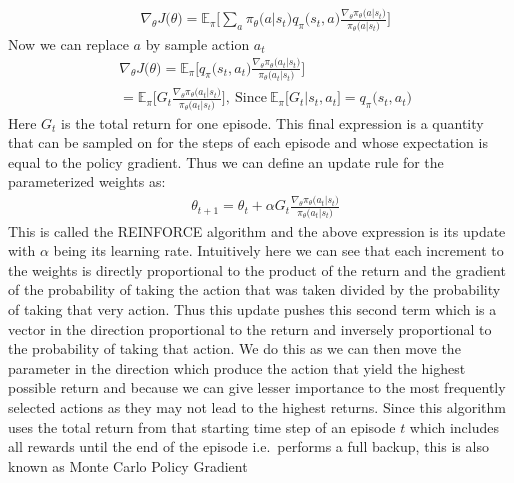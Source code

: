 \documentclass[14pt]{extarticle}
\numberwithin{equation}{section}
\begin{document}
	\begin{align}
	&\nabla_{\theta}J\big(\theta\big) = \mathbb{E}_{\pi}\bigg[\sum_{a}\pi_{\theta}\big(a|s_t\big)q_{\pi}\big(s_t,a\big)\frac{\nabla_{\theta}\pi_{\theta}\big(a|s_t\big)}{\pi_{\theta}\big(a|s_t\big)} \bigg]
	\end{align}
	Now we can replace $a$ by sample action $a_t$
	\begin{align}
	&\nabla_{\theta}J\big(\theta\big) = \mathbb{E}_{\pi}\bigg[q_{\pi}\big(s_t,a_t\big)\frac{\nabla_{\theta}\pi_{\theta}\big(a_t|s_t\big)}{\pi_{\theta}\big(a_t|s_t\big)} \bigg] \nonumber \\
	&=\mathbb{E}_{\pi}\bigg[G_t\frac{\nabla_{\theta}\pi_{\theta}\big(a_t|s_t\big)}{\pi_{\theta}\big(a_t|s_t\big)} \bigg],\ \text{Since} \  \mathbb{E}_{\pi}\big[G_t|s_t,a_t\big] = q_{\pi}\big(s_t,a_t\big)
	\end{align}
	Here $G_t$ is the total return for one episode. This final expression is a quantity that can be sampled on for the steps of each episode and whose expectation is equal to the policy gradient. Thus we can define an update rule for the parameterized weights as:
	\begin{align}
	&\theta_{t+1} = \theta_t + \alpha G_t\frac{\nabla_{\theta}\pi_{\theta}\big(a_t|s_t\big)}{\pi_{\theta}\big(a_t|s_t\big)} \label{eq:reinforce-update}
	\end{align}
	This is called the REINFORCE algorithm and the above expression is its update with $\alpha$ being its learning rate. Intuitively here we can see that each increment to the weights is directly proportional to the product of the return and the gradient of the probability of taking the action that was taken divided by the probability of taking that very action. Thus this update pushes this second term which is a vector in the direction proportional to the return and inversely proportional to the probability of taking that action. We do this as we can then move the parameter in the direction which produce the action that yield the highest possible return and because we can give lesser importance to the most frequently selected actions as they may not lead to the highest returns. Since this algorithm uses the total return from that starting time step of an episode $t$ which includes all rewards until the end of the episode i.e.\ performs a full backup, this is also known as Monte Carlo Policy Gradient
\end{document}
